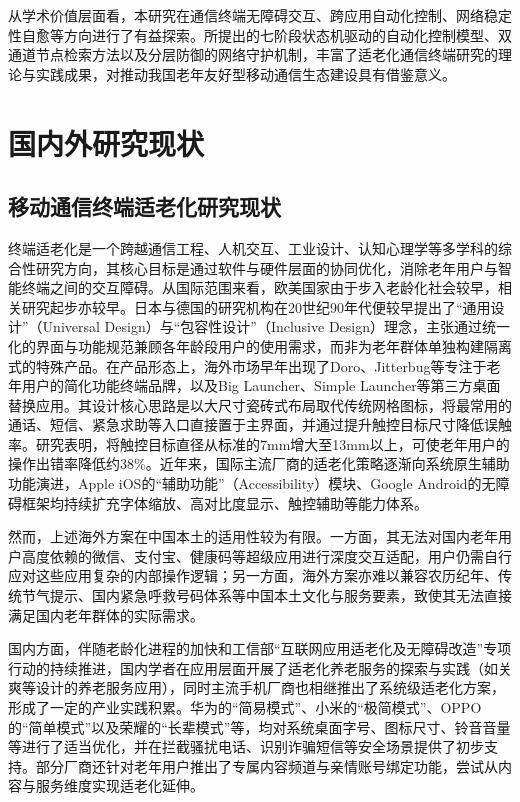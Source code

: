 从学术价值层面看，本研究在通信终端无障碍交互、跨应用自动化控制、网络稳定性自愈等方向进行了有益探索。所提出的七阶段状态机驱动的自动化控制模型、双通道节点检索方法以及分层防御的网络守护机制，丰富了适老化通信终端研究的理论与实践成果，对推动我国老年友好型移动通信生态建设具有借鉴意义。

\section{国内外研究现状}

\subsection{移动通信终端适老化研究现状}
终端适老化是一个跨越通信工程、人机交互、工业设计、认知心理学等多学科的综合性研究方向，其核心目标是通过软件与硬件层面的协同优化，消除老年用户与智能终端之间的交互障碍。从国际范围来看，欧美国家由于步入老龄化社会较早，相关研究起步亦较早。日本与德国的研究机构在20世纪90年代便较早提出了“通用设计”（Universal Design）与“包容性设计”（Inclusive Design）理念，主张通过统一化的界面与功能规范兼顾各年龄段用户的使用需求，而非为老年群体单独构建隔离式的特殊产品。在产品形态上，海外市场早年出现了Doro、Jitterbug等专注于老年用户的简化功能终端品牌，以及Big Launcher、Simple Launcher等第三方桌面替换应用。其设计核心思路是以大尺寸瓷砖式布局取代传统网格图标，将最常用的通话、短信、紧急求助等入口直接置于主界面，并通过提升触控目标尺寸降低误触率。研究表明，将触控目标直径从标准的7mm增大至13mm以上，可使老年用户的操作出错率降低约38\%。近年来，国际主流厂商的适老化策略逐渐向系统原生辅助功能演进，Apple iOS的“辅助功能”（Accessibility）模块、Google Android的无障碍框架均持续扩充字体缩放、高对比度显示、触控辅助等能力体系。

然而，上述海外方案在中国本土的适用性较为有限。一方面，其无法对国内老年用户高度依赖的微信、支付宝、健康码等超级应用进行深度交互适配，用户仍需自行应对这些应用复杂的内部操作逻辑；另一方面，海外方案亦难以兼容农历纪年、传统节气提示、国内紧急呼救号码体系等中国本土文化与服务要素，致使其无法直接满足国内老年群体的实际需求。

国内方面，伴随老龄化进程的加快和工信部“互联网应用适老化及无障碍改造”专项行动的持续推进，国内学者在应用层面开展了适老化养老服务的探索与实践（如关爽等设计的养老服务应用），同时主流手机厂商也相继推出了系统级适老化方案，形成了一定的产业实践积累。华为的“简易模式”、小米的“极简模式”、OPPO的“简单模式”以及荣耀的“长辈模式”等，均对系统桌面字号、图标尺寸、铃音音量等进行了适当优化，并在拦截骚扰电话、识别诈骗短信等安全场景提供了初步支持。部分厂商还针对老年用户推出了专属内容频道与亲情账号绑定功能，尝试从内容与服务维度实现适老化延伸。

